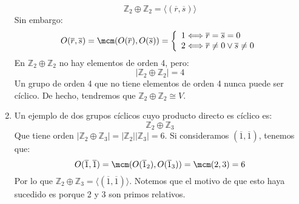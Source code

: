 \begin{ejemplo}
\begin{enumerate}
\begin{equation*}
                \mathbb{Z}_2\oplus\mathbb{Z}_2 = \langle (\overline{r},\overline{s}) \rangle 
            \end{equation*}
            Sin embargo:
            \begin{equation*}
                O(\overline{r},\overline{s}) = \mcm(O(\overline{r}),O(\overline{s})) = \left\{\begin{array}{l}
                    1 \Longleftrightarrow \overline{r}=\overline{s}=0 \\
                    2 \Longleftrightarrow \overline{r}\neq0 \lor \overline{s}\neq 0
                \end{array}\right.
            \end{equation*}
            En $\mathbb{Z}_2\oplus\mathbb{Z}_2$ no hay elementos de orden 4, pero:
            \begin{equation*}
                |\mathbb{Z}_2\oplus\mathbb{Z}_2| = 4
            \end{equation*}
            Un grupo de orden 4 que no tiene elementos de orden 4 nunca puede ser cíclico. De hecho, tendremos que $\mathbb{Z}_2\oplus\mathbb{Z}_2\cong V$.
        \item Un ejemplo de dos grupos cíclicos cuyo producto directo es cíclico es:
            \begin{equation*}
                \mathbb{Z}_2\oplus \mathbb{Z}_3
            \end{equation*}
            Que tiene orden $|\mathbb{Z}_2\oplus \mathbb{Z}_3| = |\mathbb{Z}_2||\mathbb{Z}_3| = 6$. Si consideramos $(\overline{1}, \overline{1})$, tenemos que:
            \begin{equation*}
                O(\overline{1},\overline{1}) = \mcm(O(\overline{1}_2), O(\overline{1}_3)) = \mcm(2,3) = 6
            \end{equation*}
            Por lo que $\mathbb{Z}_2 \oplus \mathbb{Z}_3 = \langle (\overline{1},\overline{1}) \rangle $. Notemos que el motivo de que esto haya sucedido es porque 2 y 3 son primos relativos.
    \end{enumerate}
\end{ejemplo}

